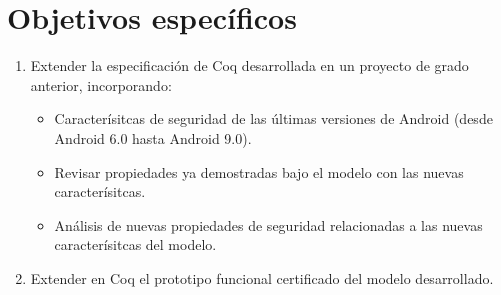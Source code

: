 \section{Objetivos específicos}
\begin{enumerate}
    \item Extender la especificación de Coq desarrollada en un proyecto de grado anterior,
          incorporando:
          \label{item:especificacion-coq}
          \begin{itemize}
              \item Caracterísitcas de seguridad de las últimas versiones de
                    Android (desde Android 6.0 hasta Android 9.0).
              \item Revisar propiedades ya demostradas bajo el modelo con las
                    nuevas caracterísitcas.
              \item Análisis de nuevas propiedades de seguridad relacionadas a
                    las nuevas caracterísitcas del modelo.
          \end{itemize}
    \item Extender en Coq el prototipo funcional certificado del modelo desarrollado.
          \label{item:prototipo}
\end{enumerate}